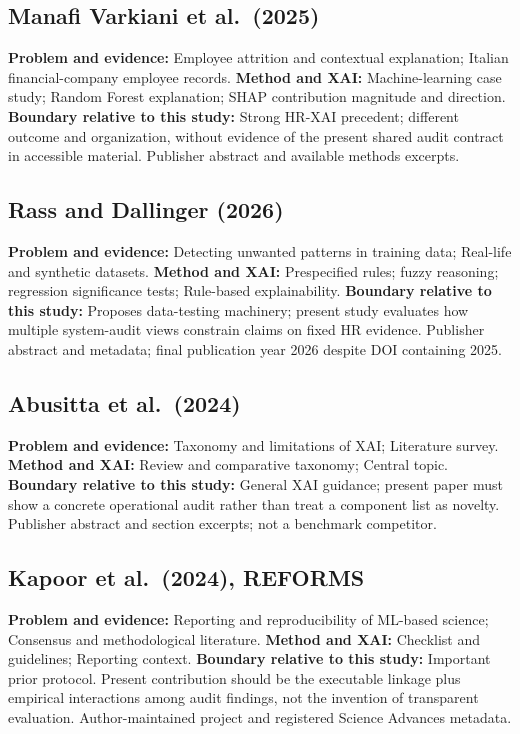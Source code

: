 \documentclass[
  a4paper,
  review]{elsarticle}
\begin{document}
\subsection{Manafi Varkiani et
al.~(2025)}\label{manafi-varkiani-et-al.-2025}

\textbf{Problem and evidence:} Employee attrition and contextual
explanation; Italian financial-company employee records. \textbf{Method
and XAI:} Machine-learning case study; Random Forest explanation; SHAP
contribution magnitude and direction. \textbf{Boundary relative to this
study:} Strong HR-XAI precedent; different outcome and organization,
without evidence of the present shared audit contract in accessible
material. Publisher abstract and available methods excerpts.

\subsection{Rass and Dallinger (2026)}\label{rass-and-dallinger-2026}

\textbf{Problem and evidence:} Detecting unwanted patterns in training
data; Real-life and synthetic datasets. \textbf{Method and XAI:}
Prespecified rules; fuzzy reasoning; regression significance tests;
Rule-based explainability. \textbf{Boundary relative to this study:}
Proposes data-testing machinery; present study evaluates how multiple
system-audit views constrain claims on fixed HR evidence. Publisher
abstract and metadata; final publication year 2026 despite DOI
containing 2025.

\subsection{Abusitta et al.~(2024)}\label{abusitta-et-al.-2024}

\textbf{Problem and evidence:} Taxonomy and limitations of XAI;
Literature survey. \textbf{Method and XAI:} Review and comparative
taxonomy; Central topic. \textbf{Boundary relative to this study:}
General XAI guidance; present paper must show a concrete operational
audit rather than treat a component list as novelty. Publisher abstract
and section excerpts; not a benchmark competitor.

\subsection{Kapoor et al.~(2024),
REFORMS}\label{kapoor-et-al.-2024-reforms}

\textbf{Problem and evidence:} Reporting and reproducibility of ML-based
science; Consensus and methodological literature. \textbf{Method and
XAI:} Checklist and guidelines; Reporting context. \textbf{Boundary
relative to this study:} Important prior protocol. Present contribution
should be the executable linkage plus empirical interactions among audit
findings, not the invention of transparent evaluation. Author-maintained
project and registered Science Advances metadata.
\end{document}
